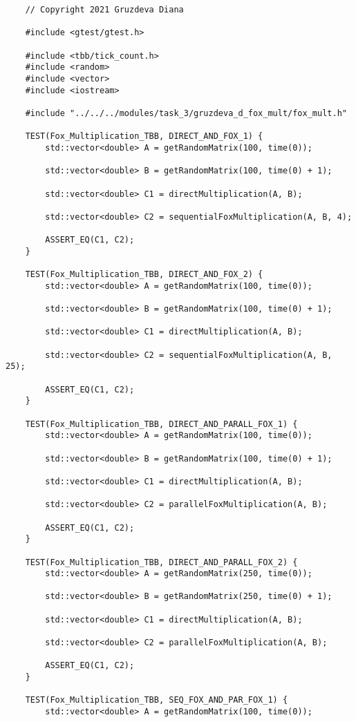 \documentclass{article}
\begin{document}
\begin{lstlisting}
	// Copyright 2021 Gruzdeva Diana

	#include <gtest/gtest.h>

	#include <tbb/tick_count.h>
	#include <random>
	#include <vector>
	#include <iostream>

	#include "../../../modules/task_3/gruzdeva_d_fox_mult/fox_mult.h"

	TEST(Fox_Multiplication_TBB, DIRECT_AND_FOX_1) {
    	std::vector<double> A = getRandomMatrix(100, time(0));

    	std::vector<double> B = getRandomMatrix(100, time(0) + 1);

    	std::vector<double> C1 = directMultiplication(A, B);

    	std::vector<double> C2 = sequentialFoxMultiplication(A, B, 4);

    	ASSERT_EQ(C1, C2);
	}

	TEST(Fox_Multiplication_TBB, DIRECT_AND_FOX_2) {
    	std::vector<double> A = getRandomMatrix(100, time(0));

    	std::vector<double> B = getRandomMatrix(100, time(0) + 1);

    	std::vector<double> C1 = directMultiplication(A, B);

    	std::vector<double> C2 = sequentialFoxMultiplication(A, B, 25);

    	ASSERT_EQ(C1, C2);
	}

	TEST(Fox_Multiplication_TBB, DIRECT_AND_PARALL_FOX_1) {
    	std::vector<double> A = getRandomMatrix(100, time(0));

    	std::vector<double> B = getRandomMatrix(100, time(0) + 1);

    	std::vector<double> C1 = directMultiplication(A, B);

    	std::vector<double> C2 = parallelFoxMultiplication(A, B);

    	ASSERT_EQ(C1, C2);
	}

	TEST(Fox_Multiplication_TBB, DIRECT_AND_PARALL_FOX_2) {
    	std::vector<double> A = getRandomMatrix(250, time(0));

    	std::vector<double> B = getRandomMatrix(250, time(0) + 1);

    	std::vector<double> C1 = directMultiplication(A, B);

    	std::vector<double> C2 = parallelFoxMultiplication(A, B);

    	ASSERT_EQ(C1, C2);
	}

	TEST(Fox_Multiplication_TBB, SEQ_FOX_AND_PAR_FOX_1) {
    	std::vector<double> A = getRandomMatrix(100, time(0));


\end{lstlisting}
\end{document}
